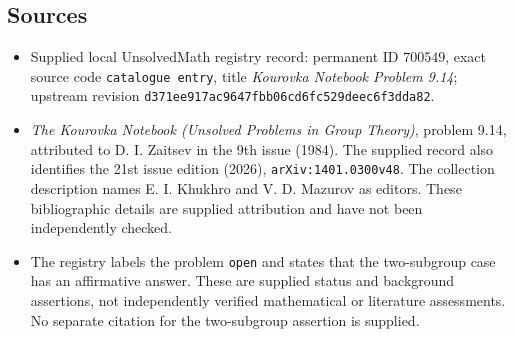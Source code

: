\documentclass[11pt]{article}
\begin{document}
\subsection{Sources}
\begin{itemize}
\item Supplied local UnsolvedMath registry record: permanent ID \(700549\), exact source code \texttt{catalogue entry}, title \emph{Kourovka Notebook Problem 9.14}; upstream revision \texttt{d371ee917ac9647fbb06cd6fc529deec6f3dda82}.
\item \emph{The Kourovka Notebook (Unsolved Problems in Group Theory)}, problem 9.14, attributed to D. I. Zaitsev in the 9th issue (1984). The supplied record also identifies the 21st issue edition (2026), \texttt{arXiv:1401.0300v48}. The collection description names E. I. Khukhro and V. D. Mazurov as editors. These bibliographic details are supplied attribution and have not been independently checked.
\item The registry labels the problem \texttt{open} and states that the two-subgroup case has an affirmative answer. These are supplied status and background assertions, not independently verified mathematical or literature assessments. No separate citation for the two-subgroup assertion is supplied.
\end{itemize}
\end{document}
